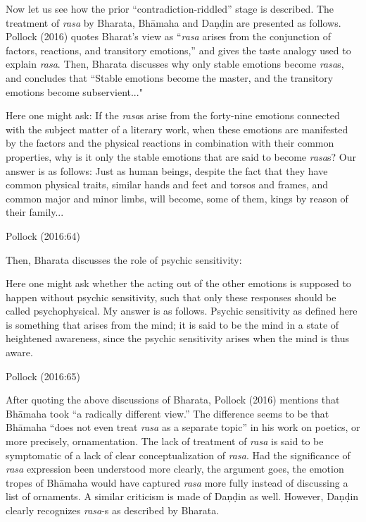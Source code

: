 Now let us see how the prior “contradiction-riddled” stage is described. The treatment of \textsl{rasa} by Bharata, Bhāmaha and Daṇḍin are presented as follows. Pollock (2016) quotes Bharat’s view as “\textsl{rasa} arises from the conjunction of factors, reactions, and transitory emotions,” and gives the taste analogy used to explain \textsl{rasa}. Then, Bharata discusses why only stable emotions become \textsl{rasa}s, and concludes that ``Stable emotions become the master, and the transitory emotions become subservient..." 

\begin{myquote}
[343] Here one might ask: If the \textsl{rasa}s arise from the forty-nine emotions connected with the subject matter of a literary work, when these emotions are manifested by the factors and the physical reactions in combination with their common properties, why is it only the stable emotions that are said to become \textsl{rasa}s? Our answer is as follows: Just as human beings, despite the fact that they have common physical traits, similar hands and feet and torsos and frames, and common major and minor limbs, will become, some of them, kings by reason of their family...

\hfill Pollock (2016:64)
\end{myquote}

Then, Bharata discusses the role of psychic sensitivity:

\begin{myquote}
[373.3] Here one might ask whether the acting out of the other emotions is supposed to happen without psychic sensitivity, such that only these responses should be called psychophysical. My answer is as follows. Psychic sensitivity as defined here is something that arises from the mind; it is said to be the mind in a state of heightened awareness, since the psychic sensitivity arises when the mind is thus aware.

\hfill Pollock (2016:65)
\end{myquote}

After quoting the above discussions of Bharata, Pollock (2016) mentions that Bhāmaha took “a radically different view.” The difference seems to be that Bhāmaha “does not even treat \textsl{rasa} as a separate topic” in his work on poetics, or more precisely, ornamentation. The lack of treatment of \textsl{rasa} is said to be symptomatic of a lack of clear conceptualization of \textsl{rasa}. Had the significance of \textsl{rasa} expression been understood more clearly, the argument goes, the emotion tropes of Bhāmaha would have captured \textsl{rasa} more fully instead of discussing a list of ornaments. A similar criticism is made of Daṇḍin as well. However, Daṇḍin clearly recognizes \textsl{rasa}-s as described by Bharata. 

